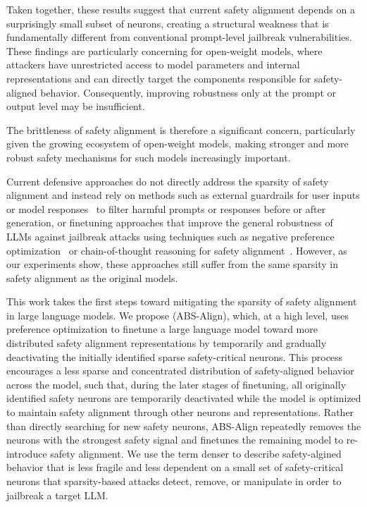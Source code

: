 Taken together, these results suggest that current safety alignment depends on a surprisingly small subset of neurons, creating a structural weakness that is fundamentally different from conventional prompt-level jailbreak vulnerabilities. These findings are particularly concerning for open-weight models, where attackers have unrestricted access to model parameters and internal representations and can directly target the components responsible for safety-aligned behavior. Consequently, improving robustness only at the prompt or output level may be insufficient.

The brittleness of safety alignment is therefore a significant concern, particularly given the growing ecosystem of open-weight models, making stronger and more robust safety mechanisms for such models increasingly important.


Current defensive approaches do not directly address the sparsity of safety alignment and instead rely on methods such as external guardrails for user inputs or model responses~\cite{Inan2023llamaguard, robey2025smoothllm, kumar2024certifying, alon2023perplexity} to filter harmful prompts or responses before or after generation, or finetuning approaches that improve the general robustness of LLMs against jailbreak attacks using techniques such as negative preference optimization~\cite{zhao2025door} or chain-of-thought reasoning for safety alignment~\cite{hu2026alignmentweighted}. However, as our experiments show, these approaches still suffer from the same sparsity in safety alignment as the original models.

This work takes the first steps toward mitigating the sparsity of safety alignment in large language models. We propose \method (ABS-Align), which, at a high level, uses preference optimization to finetune a large language model toward more distributed safety alignment representations by temporarily and gradually deactivating the initially identified sparse safety-critical neurons. This process encourages a less sparse and concentrated distribution of safety-aligned behavior across the model, such that, during the later stages of finetuning, all originally identified safety neurons are temporarily deactivated while the model is optimized to maintain safety alignment through other neurons and representations. Rather than directly searching for new safety neurons, ABS-Align repeatedly removes the neurons with the strongest safety signal and finetunes the remaining model to re-introduce safety alignment. We use the term denser to describe safety-algined behavior that is less fragile and less dependent on a small set of safety-critical neurons that sparsity-based attacks detect, remove, or manipulate in order to jailbreak a target LLM.

